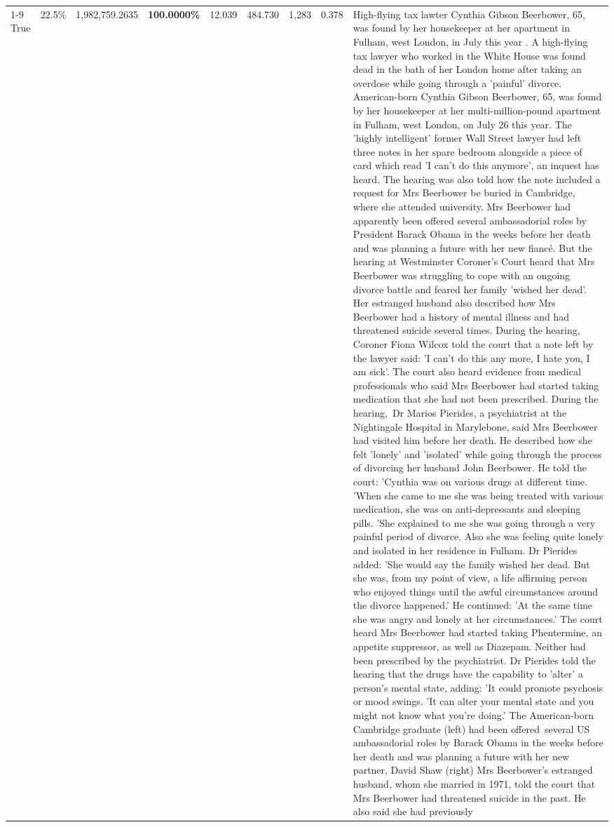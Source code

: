 \begin{table}[H]
\begin{tabular}{lllrlllll}
\cline{1-9}
True & 22.5\% & 1,982,759.2635 & \bfseries \color{red} 100.0000\% & 12.039 & 484.730 & 1,283 & 0.378 & High-flying tax lawter Cynthia Gibson Beerbower, 65, was found by her housekeeper at her apartment in Fulham, west London, in July this year . A high-flying tax lawyer who worked in the White House was found dead in the bath of her London home after taking an overdose while going through a 'painful' divorce. American-born Cynthia Gibson Beerbower, 65, was found by her housekeeper at her multi-million-pound apartment in Fulham, west London, on July 26 this year. The 'highly intelligent' former Wall Street lawyer had left three notes in her spare bedroom alongside a piece of card which read 'I can't do this anymore', an inquest has heard. The hearing was also told how the note included a request for Mrs Beerbower be buried in Cambridge, where she attended university. Mrs Beerbower had apparently been offered several ambassadorial roles by President Barack Obama in the weeks before her death and was planning a future with her new fiancé. But the hearing at Westminster Coroner's Court heard that Mrs Beerbower was struggling to cope with an ongoing divorce battle and feared her family 'wished her dead'. Her estranged husband also described how Mrs Beerbower had a history of mental illness and had threatened suicide several times. During the hearing, Coroner Fiona Wilcox told the court that a note left by the lawyer said: 'I can't do this any more, I hate you, I am sick'. The court also heard evidence from medical professionals who said Mrs Beerbower had started taking medication that she had not been prescribed. During the hearing, Dr Marios Pierides, a psychiatrist at the Nightingale Hospital in Marylebone, said Mrs Beerbower had visited him before her death. He described how she felt 'lonely' and 'isolated' while going through the process of divorcing her husband John Beerbower. He told the court: 'Cynthia was on various drugs at different time. 'When she came to me she was being treated with various medication, she was on anti-depressants and sleeping pills. 'She explained to me she was going through a very painful period of divorce. Also she was feeling quite lonely and isolated in her residence in Fulham. Dr Pierides added: 'She would say the family wished her dead. But she was, from my point of view, a life affirming person who enjoyed things until the awful circumstances around the divorce happened.' He continued: 'At the same time she was angry and lonely at her circumstances.' The court heard Mrs Beerbower had started taking Phentermine, an appetite suppressor, as well as Diazepam. Neither had been prescribed by the psychiatrist. Dr Pierides told the hearing that the drugs have the capability to 'alter' a person's mental state, adding: 'It could promote psychosis or mood swings. 'It can alter your mental state and you might not know what you're doing.' The American-born Cambridge graduate (left) had been offered several US ambassadorial roles by Barack Obama in the weeks before her death and was planning a future with her new partner, David Shaw (right) Mrs Beerbower's estranged husband, whom she married in 1971, told the court that Mrs Beerbower had threatened suicide in the past. He also said she had previously 
\end{tabular}
\end{table}
